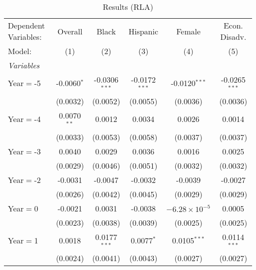 
\begin{table}[htbp]
   \centering
   \caption{\label{MainResultsRLA} Results (RLA)}
   \begin{tabular}{lccccc}
      \tabularnewline\midrule\midrule
      Dependent Variables: & Overall                & Black           & Hispanic        & Female                 & Econ. Disadv.\\
      Model:               & (1)                    & (2)             & (3)             & (4)                    & (5)\\
      \midrule \emph{Variables} &   &   &   &   &  \\
      Year$=$-5            & -0.0060$^{*}$          & -0.0306$^{***}$ & -0.0172$^{***}$ & -0.0120$^{***}$        & -0.0265$^{***}$\\
                           & (0.0032)               & (0.0052)        & (0.0055)        & (0.0036)               & (0.0036)\\
      Year$=$-4            & 0.0070$^{**}$          & 0.0012          & 0.0034          & 0.0026                 & 0.0014\\
                           & (0.0033)               & (0.0053)        & (0.0058)        & (0.0037)               & (0.0037)\\
      Year$=$-3            & 0.0040                 & 0.0029          & 0.0036          & 0.0016                 & 0.0025\\
                           & (0.0029)               & (0.0046)        & (0.0051)        & (0.0032)               & (0.0032)\\
      Year$=$-2            & -0.0031                & -0.0047         & -0.0032         & -0.0039                & -0.0027\\
                           & (0.0026)               & (0.0042)        & (0.0045)        & (0.0029)               & (0.0029)\\
      Year$=$0             & -0.0021                & 0.0031          & -0.0038         & $-6.28\times 10^{-5}$ & 0.0005\\
                           & (0.0023)               & (0.0038)        & (0.0039)        & (0.0025)               & (0.0025)\\
      Year$=$1             & 0.0018                 & 0.0177$^{***}$  & 0.0077$^{*}$    & 0.0105$^{***}$         & 0.0114$^{***}$\\
                           & (0.0024)               & (0.0041)        & (0.0043)        & (0.0027)               & (0.0027)\\

\end{tabular}
\end{table}
